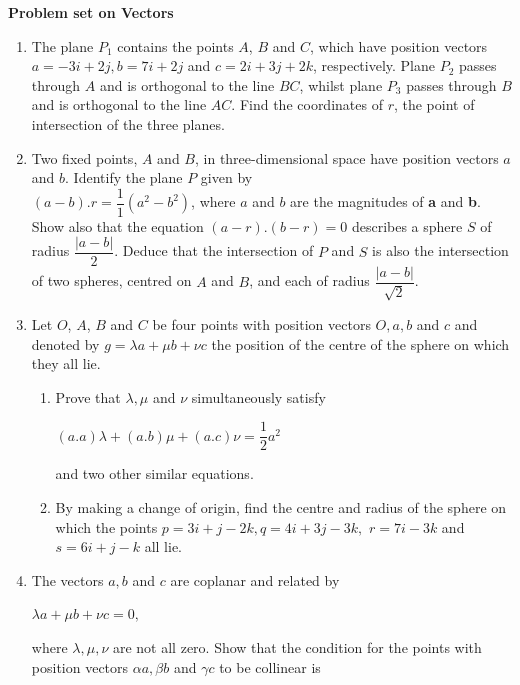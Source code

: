 \documentclass[fleqn]{article}
\begin{document}
\pagebreak

\textbf{Problem set on Vectors}

\begin{enumerate}

  \item  The plane $P_1$ contains the points $A$, $B$ and $C$, which have position vectors $a = −3i + 2j, b = 7i + 2j$ and $c = 2i + 3j + 2k$, respectively. Plane $P_2$ passes through $A$ and is orthogonal to the line $BC$, whilst plane $P_3$ passes through $B$ and is orthogonal to the line $AC$. Find the coordinates of $r$, the point of intersection of the three planes.
  
  \item  Two fixed points, $A$ and $B$, in three-dimensional space have position vectors $a$ and $b$. Identify the plane $P$ given by \\
  $(a-b).r=\dfrac{1}{1}(a^2-b^2)$, where $a$ and $b$ are the magnitudes of \textbf{a} and \textbf{b}. Show also that the equation $(a-r).(b-r)=0$ describes a sphere $S$ of radius $\dfrac{|a − b|}{2}$. Deduce that the intersection of $P$ and $S$ is also the intersection of two spheres, centred on $A$ and $B$, and each of radius $\dfrac{|a − b|}{\sqrt{2}}$.
  
  \item  Let $O$, $A$, $B$ and $C$ be four points with position vectors $O, a, b$ and $c$ and denoted by $g=\lambda a+ \mu b+\nu c$ the position of the centre of the sphere on which they all lie.
  
  
    \begin{enumerate}
      \item Prove that $\lambda, \mu$ and $\nu$ simultaneously satisfy

      $(a.a)\lambda + (a.b) \mu+ (a.c)\nu = \dfrac{1}{2} a^2$

      and two other similar equations. 
      
      \item By making a change of origin, find the centre and radius of the sphere on which the points $p=3i+j−2k, q=4i+3j−3k,$ $r=7i−3k$ and $s=6i+j−k$ all lie.
    \end{enumerate}  
  
  \item  The vectors $a, b$ and $c$ are coplanar and related by

  $\lambda a+\mu b+\nu c=0,$
  
  where $\lambda, \mu, \nu$ are not all zero. Show that the condition for the points with position vectors $\alpha a, \beta b$ and $\gamma c$ to be collinear is 


\end{enumerate}
\end{document}
